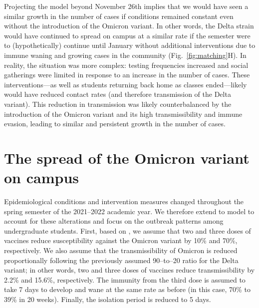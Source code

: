 \documentclass[12pt]{article}
\newcommand{\fref}[1]{Fig.~\ref{fig:#1}}
\begin{document}
Projecting the model beyond November 26th implies that we would have seen a similar growth in the number of cases if conditions remained constant even without the introduction of the Omicron variant.
In other words, the Delta strain would have continued to spread on campus at a similar rate if the semester were to (hypothetically) continue until January without additional interventions due to immune waning and growing cases in the community (\fref{matching}H).
In reality, the situation was more complex: testing frequencies increased and social gatherings were limited in response to an increase in the number of cases.
These interventions---as well as students returning back home as classes ended---likely would have reduced contact rates (and therefore transmission of the Delta variant).
This reduction in transmission was likely counterbalanced by the introduction of the Omicron variant and its high transmissibility and immune evasion, leading to similar and persistent growth in the number of cases.

\section*{The spread of the Omicron variant on campus}

Epidemiological conditions and intervention measures changed throughout the spring semester of the 2021--2022 academic year.
We therefore extend to model to account for these alterations and focus on the outbreak patterns among undergraduate students.
First, based on \citep{ferguson2021report}, we assume that two and three doses of vaccines reduce susceptibility against the Omicron variant by 10\% and 70\%, respectively. 
We also assume that the transmissibility of Omicron is reduced proportionally following the previously assumed 90--to--20 ratio for the Delta variant;
in other words, two and three doses of vaccines reduce transmissibility by 2.2\% and 15.6\%, respectively.
The immunity from the third dose is assumed to take 7 days to develop \citep{moreira2022safety} and wane at the same rate as before (in this case, 70\% to 39\% in 20 weeks).
Finally, the isolation period is reduced to 5 days.
\end{document}
